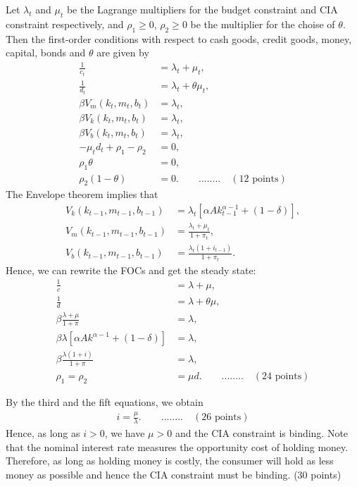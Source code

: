 \documentclass[12pt]{article}
\begin{document}
Let $\lambda_t$ and $\mu_t$ be the Lagrange multipliers for the budget constraint and CIA constraint respectively, and $\rho_1 \geq 0$, $\rho_2 \geq 0$ be the multiplier for the choise of $\theta$. Then the first-order conditions with respect to cash goods, credit goods, money, capital, bonds and $\theta$ are given by
\begin{align*}
    \frac{1}{c_t} & = \lambda_t + \mu_t, \\
    \frac{1}{d_t} &= \lambda_t + \theta \mu_t, \\
    \beta V_m(k_t, m_t, b_t) &= \lambda_t,\\
    \beta V_k(k_t, m_t, b_t) &= \lambda_t,\\
    \beta V_b(k_t, m_t, b_t) &= \lambda_t,\\
    -\mu_t d_t + \rho_1 - \rho_2 &= 0,\\
    \rho_1 \theta &= 0, \\
    \rho_2 (1-\theta) &= 0. \qquad ........ \quad(12 \text{ points})
\end{align*}
The Envelope theorem implies that
\begin{align*}
    V_k(k_{t-1} , m_{t-1}, b_{t-1}) &= \lambda_t \left[\alpha A k_{t-1}^{\alpha-1} + (1-\delta)\right],\\
    V_m(k_{t-1} , m_{t-1}, b_{t-1}) &= \frac{\lambda_t + \mu_t}{1+\pi_t},\\
    V_b(k_{t-1} , m_{t-1}, b_{t-1}) &= \frac{\lambda_t(1+i_{t-1})}{1+\pi_t}.
\end{align*}
Hence, we can rewrite the FOCs and get the steady state:
\begin{align*}
    \frac{1}{c} &= \lambda + \mu,\\
    \frac{1}{d} &= \lambda + \theta \mu,\\
    \beta \frac{\lambda+ \mu}{1+\pi} &= \lambda,\\
    \beta \lambda \left[\alpha A k^{\alpha-1} + (1-\delta)\right] &= \lambda,\\
    \beta \frac{\lambda(1+i)}{1+\pi} &= \lambda,\\
    \rho_1 = \rho_2 &= \mu d. \qquad ........ \quad(24 \text{ points})
\end{align*}

By the third and the fift equations, we obtain
\begin{align*}
    i = \frac{\mu}{\lambda}. \qquad ........ \quad(26 \text{ points})
\end{align*}
Hence, as long as $i > 0$, we have $\mu > 0$ and the CIA constraint is binding. Note that the nominal interest rate measures the opportunity cost of holding money. Therefore, as long as holding money is costly, the consumer will hold as less money as possible and hence the CIA constraint must be binding. (30 points)
\end{document}
